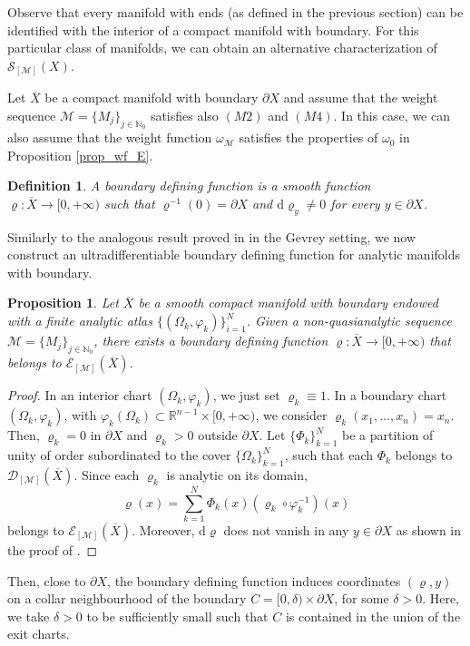 \documentclass[11pt,reqno]{amsart}
\numberwithin{equation}{section}
\newtheorem{definition}[theorem]{Definition}
\newtheorem{proposition}[theorem]{Proposition}
\newcommand{\E}{{\mathcal{E}}}
\newcommand{\D}{{\mathcal{D}}}
\newcommand{\Mj}{{\{M_j\}_{j\in\mathbb{N}_0}}} %
\newcommand{\M}{{\mathcal{M}}} %
\newcommand{\X}{{\overline{X}}}
\begin{document}
Observe that every manifold with ends (as defined in the previous section) can be identified with the interior of a compact manifold with boundary. For this particular class of manifolds, we can obtain an alternative characterization of $\mathcal{S}_{[\M]}(X)$. 

Let $\X$ be a compact manifold with boundary $\partial X$ and assume that the weight sequence $\M=\Mj$ satisfies also $(M2)$ and $(M4)$. In this case, we can also assume that the weight function $\omega_\M$ satisfies the properties of $\omega_0$ in Proposition \ref{prop_wf_E}.

\begin{definition}
	A boundary defining function is a smooth function $\varrho:\overline{X}\to [0,+\infty)$ such that $\varrho^{-1}(0)=\partial X$ and $\mathrm{d}\varrho_{y}\neq 0$ for every $y\in\partial X$.
\end{definition}

Similarly to the analogous result proved in \cite{CKMT_GH_Gevrey} in the Gevrey setting, we now construct an ultradifferentiable boundary defining function for analytic manifolds with boundary.

\begin{proposition}\label{bdf_ultra}
	Let $\X$ be a smooth compact manifold with boundary endowed with a finite analytic atlas $\{(\Omega_k,\varphi_k)\}_{i=1}^N$. 
	Given a non-quasianalytic sequence $\M=\Mj$, there exists a boundary defining function $\varrho:\X\to[0,+\infty)$ that belongs to $\E_{[\M]}(\X)$.
\end{proposition}
%
\begin{proof}
	In an interior chart $(\Omega_k,\varphi_k)$, we just set $\varrho_k\equiv 1$. In a boundary chart $(\Omega_k,\varphi_k)$, with $\varphi_k(\Omega_k)\subset\mathbb{R}^{n-1}\times[0,+\infty)$, we consider $\varrho_k(x_1,\dots,x_n)=x_n$. Then, $\varrho_k=0$ in $\partial X$ and $\varrho_k>0$ outside $\partial X$. Let $\{\Phi_k\}_{k=1}^N$ be a partition of unity of order subordinated to the cover $\{\Omega_k\}_{k=1}^N$, such that each $\Phi_k$ belongs to $\D_{[\M]}(\X)$. Since each $\varrho_k$ is analytic on its domain,
	\[\varrho(x) = \sum_{k=1}^N \Phi_k(x)(\varrho_k\circ\varphi_k^{-1})(x)\]
	belongs to $\E_{[\M]}(\X)$. Moreover, $\mathrm{d}\varrho$ does not vanish in any $y\in \partial X$ as shown in the proof of \cite[Proposition 5.41]{Lee_smooth}.
\end{proof}


Then, close to $\partial X$, the boundary defining function induces coordinates $(\varrho,y)$ on a collar neighbourhood of the boundary $C = [0,\delta)\times\partial X$, for some $\delta>0$. Here, we take $\delta>0$ to be sufficiently small such that $C$ is contained in the union of the exit charts.
\end{document}
